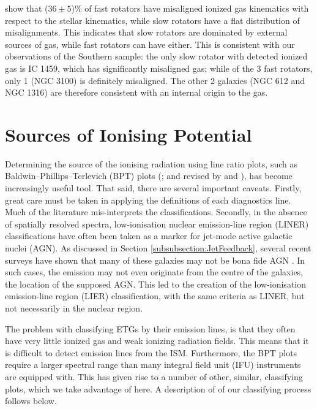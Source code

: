 	\citet{Davis2011a} show that ($36\pm5$)\% of fast rotators have misaligned ionized gas kinematics with respect to the stellar kinematics, while slow rotators have a flat distribution of misalignments. This indicates that slow rotators are dominated by external sources of gas, while fast rotators can have either. This is consistent with our observations of the Southern sample: the only slow rotator with detected ionized gas is IC 1459, which has significantly misaligned gas; while of the 3 fast rotators, only 1 (NGC 3100) is definitely misaligned. The other 2 galaxies (NGC 612 and NGC 1316) are therefore consistent with an internal origin to the gas.



\section{Sources of Ionising Potential}
	\label{sec:Diagnostics}
	Determining the source of the ionising radiation using line ratio plots, such as Baldwin--Phillips--Terlevich (BPT) plots (\citealt{Baldwin1981}; and revised by \citealt{Kewley2001, Kewley2006} and \citealt{Kauffmann2003a}), has become increasingly useful tool. That said, there are several important caveats. Firstly, great care must be taken in applying the definitions of each diagnostics line. Much of the literature mis-interprets the classifications. Secondly, in the absence of spatially resolved spectra, low-ionisation nuclear emission-line region (LINER) classifications have often been taken as a marker for jet-mode active galactic nuclei (AGN). As discussed in Section \ref{subsubsection:JetFeedback}, several recent surveys have shown that many of these galaxies may not be bona fide AGN \citep[e.g.][]{Sarzi2005, Sarzi2010, Singh2013, Belfiore2016a}. In such cases, the emission may not even originate from the centre of the galaxies, the location of the supposed AGN. This led to the creation of the low-ionisation emission-line region (LIER) classification, with the same criteria as LINER, but not necessarily in the nuclear region.

	The problem with classifying ETGs by their emission lines, is that they often have very little ionized gas and weak ionizing radiation fields. This means that it is difficult to detect emission lines from the ISM. Furthermore, the BPT plots require a larger spectral range than many integral field unit (IFU) instruments are equipped with. This has given rise to a number of other, similar, classifying plots, which we take advantage of here. A description of of our classifying process follows below. 

